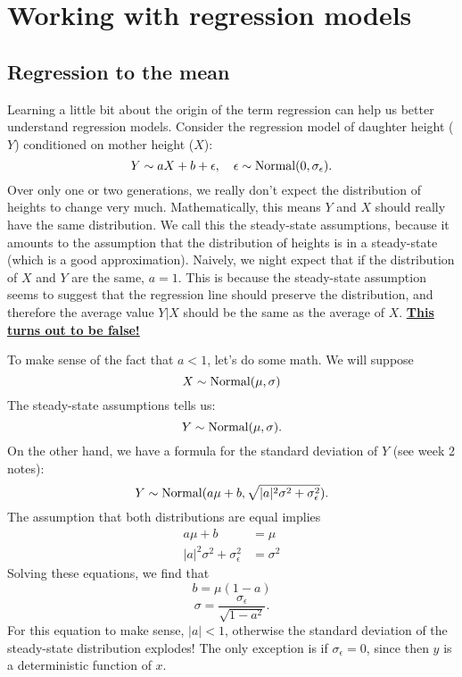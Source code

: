 \chapter{Working with regression models}




\section{Regression to the mean}

Learning a little bit about the origin of the term regression can help us better understand regression models. Consider the regression model of daughter height ($Y$) conditioned on mother height ($X$): 
\begin{equation}
Y \sim aX + b + \epsilon,\quad \epsilon \sim {\rm Normal}(0,\sigma_{\epsilon}). 
\end{equation}
Over only one or two generations, we really don't expect the distribution of heights to change very much. Mathematically, this means $Y$ and $X$ should really have the same distribution. We call this the {\dfn steady-state} assumptions, because it amounts to the assumption that the distribution of heights is in a steady-state (which is a good approximation). Naively, we night expect that if the distribution of $X$ and $Y$ are the same, $a=1$. This is because the steady-state assumption seems to suggest that the regression line should preserve the distribution, and therefore the average value $Y|X$ should be the same as the average of $X$. \href{https://colab.research.google.com/drive/143hintE_kXYGkEIphvkUz5ngCdNu22F0#scrollTo=qlEMNiOlRDcW&line=1&uniqifier=1}{\bf This turns out to be false!}


To make sense of the fact that $a<1$, let's do some math. We will suppose
\begin{equation}
X \sim {\rm Normal}(\mu,\sigma)
\end{equation}
The steady-state assumptions tells us:
\begin{equation}
Y \sim {\rm Normal}(\mu,\sigma).
\end{equation}
On the other hand, we have a formula for the standard deviation of $Y$ (see week 2 notes):
\begin{equation}
Y \sim {\rm Normal}(a \mu + b,\sqrt{|a|^2\sigma^2 + \sigma_{\epsilon}^2}).
\end{equation}
The assumption that both distributions are equal implies 
\begin{align}
a \mu + b &= \mu\\
|a|^2\sigma^2 + \sigma_{\epsilon}^2 &= \sigma^2
\end{align}
Solving these equations, we find that 
\begin{equation}
b = \mu (1-a)
\end{equation}
\begin{equation}
\sigma = \frac{\sigma_{\epsilon}}{\sqrt{1-a^2}}. 
\end{equation}
For this equation to make sense, $|a|<1$, otherwise the standard deviation of the steady-state distribution explodes! The only exception is if $\sigma_{\epsilon}=0$, since then $y$ is a deterministic function of $x$.

